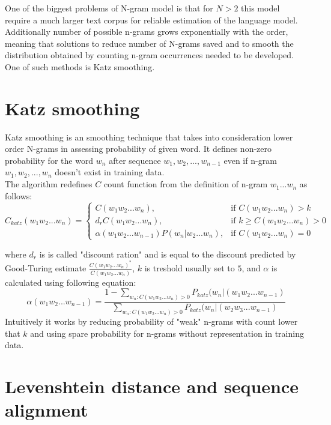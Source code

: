 \documentclass[a4paper,11pt,twoside]{report}
\theoremstyle{definition}
\begin{document}
One of the biggest problems of N-gram model is that for $N>2$ this model require a much larger text corpus for reliable estimation of the language model. Additionally number of possible n-grams grows exponentially with the order, meaning that solutions to reduce number of N-grams saved and to smooth the distribution obtained by counting n-gram occurrences needed to be developed. One of such methods is Katz smoothing.

\section{Katz smoothing}

Katz smoothing \cite{NGram, Katz} is an smoothing technique that takes into consideration lower order N-grams in assessing probability of given word. It defines non-zero probability for the word $w_n$ after sequence $w_1, w_2, ..., w_{n-1}$ even if n-gram $w_1, w_2, ..., w_n$ doesn't exist in training data. \\
The algorithm redefines $C$ count function from the definition of n-gram $w_1 ... w_n$ as follows:
\begin{equation}
    C_{katz}(w_1 w_2 ... w_n) = 
    \begin{cases}
    C(w_1 w_2 ... w_n),& \text{if } C(w_1 w_2 ... w_n)>k \\
    d_r C(w_1 w_2 ... w_n),& \text{if } k \geq C(w_1 w_2 ... w_n) > 0 \\
    \alpha (w_1 w_2 ... w_{n-1}) P(w_n | w_2 ... w_n),& \text{if } C(w_1 w_2 ... w_n) = 0
    \end{cases}
\end{equation}

where $d_r$ is is called "discount ration" and is equal to the discount predicted by Good-Turing estimate $\frac{C(w_1 w_2 ... w_n)^*}{C(w_1 w_2 ... w_n)}$, $k$ is treshold usually set to $5$, and $\alpha$ is calculated using following equation:
$$
\alpha (w_1 w_2 ... w_{n-1}) = \frac{1-\sum_{w_n:C(w_1 w_2 ... w_n)>0}P_{katz}(w_n | (w_1 w_2 ... w_{n-1})}{\sum_{w_n:C(w_1 w_2 ... w_n)>0}P_{katz}(w_n | (w_2 w_3 ... w_{n-1})}
$$
Intuitively it works by reducing probability of "weak" n-grams with count lower that $k$ and using spare probability for n-grams without representation in training data.

\section{Levenshtein distance and sequence alignment}
\end{document}
